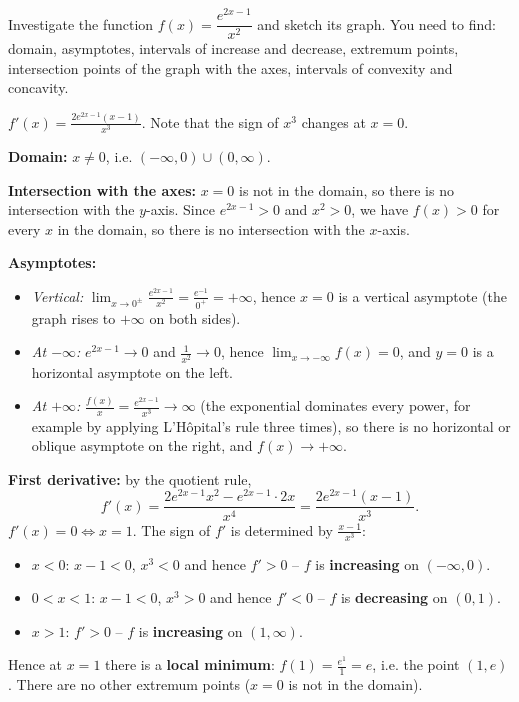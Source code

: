
\begin{question}
Investigate the function $f(x)=\dfrac{e^{2x-1}}{x^2}$ and sketch its graph.
You need to find: domain, asymptotes, intervals of increase and decrease, extremum points, intersection points of the graph with the axes, intervals of convexity and concavity.
\end{question}

\begin{hint}
$f'(x)=\frac{2e^{2x-1}(x-1)}{x^3}$. Note that the sign of $x^3$ changes at $x=0$.
\end{hint}

\begin{solution}
\textbf{Domain:} $x\neq 0$, i.e. $(-\infty,0)\cup(0,\infty)$.

\textbf{Intersection with the axes:} $x=0$ is not in the domain, so there is no intersection with the $y$-axis. Since $e^{2x-1}>0$ and $x^2>0$, we have $f(x)>0$ for every $x$ in the domain, so there is no intersection with the $x$-axis.

\textbf{Asymptotes:}
\begin{itemize}
  \item \emph{Vertical:} $\lim_{x\to0^\pm}\frac{e^{2x-1}}{x^2} = \frac{e^{-1}}{0^+} = +\infty$, hence $x=0$ is a vertical asymptote (the graph rises to $+\infty$ on both sides).
  \item \emph{At $-\infty$:} $e^{2x-1}\to0$ and $\frac1{x^2}\to0$, hence $\lim_{x\to-\infty}f(x)=0$, and $y=0$ is a horizontal asymptote on the left.
  \item \emph{At $+\infty$:} $\frac{f(x)}{x}=\frac{e^{2x-1}}{x^3}\to\infty$ (the exponential dominates every power, for example by applying L'Hôpital's rule three times), so there is no horizontal or oblique asymptote on the right, and $f(x)\to+\infty$.
\end{itemize}

\textbf{First derivative:} by the quotient rule,
\[ f'(x) = \frac{2e^{2x-1}x^2 - e^{2x-1}\cdot 2x}{x^4} = \frac{2e^{2x-1}(x-1)}{x^3}. \]
$f'(x)=0 \iff x=1$. The sign of $f'$ is determined by $\frac{x-1}{x^3}$:
\begin{itemize}
  \item $x<0$: $x-1<0$, $x^3<0$ and hence $f'>0$ -- $f$ is \textbf{increasing} on $(-\infty,0)$.
  \item $0<x<1$: $x-1<0$, $x^3>0$ and hence $f'<0$ -- $f$ is \textbf{decreasing} on $(0,1)$.
  \item $x>1$: $f'>0$ -- $f$ is \textbf{increasing} on $(1,\infty)$.
\end{itemize}
Hence at $x=1$ there is a \textbf{local minimum}: $f(1)=\frac{e^{1}}{1}=e$, i.e. the point $(1,e)$. There are no other extremum points ($x=0$ is not in the domain).


\end{solution}
